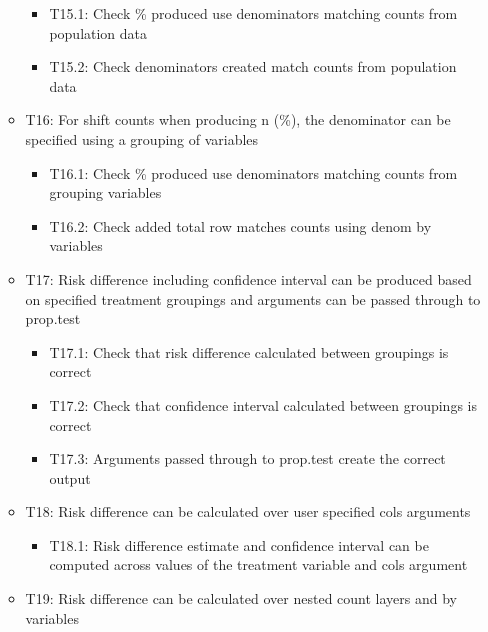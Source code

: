 \documentclass[
]{article}
\providecommand{\tightlist}{%
  \setlength{\itemsep}{0pt}\setlength{\parskip}{0pt}}
\begin{document}
\begin{itemize}
\begin{itemize}
    \begin{itemize}
    \tightlist
    \item
      T15.1: Check \% produced use denominators matching counts from
      population data
    \item
      T15.2: Check denominators created match counts from population
      data
    \end{itemize}
  \item
    T16: For shift counts when producing n (\%), the denominator can be
    specified using a grouping of variables

    \begin{itemize}
    \tightlist
    \item
      T16.1: Check \% produced use denominators matching counts from
      grouping variables
    \item
      T16.2: Check added total row matches counts using denom by
      variables
    \end{itemize}
  \item
    T17: Risk difference including confidence interval can be produced
    based on specified treatment groupings and arguments can be passed
    through to prop.test

    \begin{itemize}
    \tightlist
    \item
      T17.1: Check that risk difference calculated between groupings is
      correct
    \item
      T17.2: Check that confidence interval calculated between groupings
      is correct
    \item
      T17.3: Arguments passed through to prop.test create the correct
      output
    \end{itemize}
  \item
    T18: Risk difference can be calculated over user specified cols
    arguments

    \begin{itemize}
    \tightlist
    \item
      T18.1: Risk difference estimate and confidence interval can be
      computed across values of the treatment variable and cols argument
    \end{itemize}
  \item
    T19: Risk difference can be calculated over nested count layers and
    by variables


\end{itemize}
\end{itemize}
\end{document}
